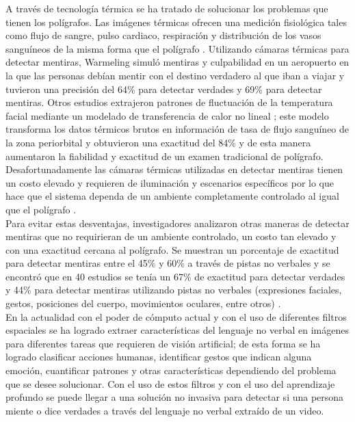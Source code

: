 \begin{onehalfspacing}
A través de tecnología térmica se ha tratado de solucionar los problemas que tienen los polígrafos. Las imágenes térmicas ofrecen una medición fisiológica tales como flujo de sangre, pulso cardiaco, respiración y distribución de los vasos sanguíneos de la misma forma que el polígrafo \cite{Rajoub2014ThermalDetection}. Utilizando cámaras térmicas para detectar mentiras, Warmeling \cite{Warmelink2011ThermalAirports} simuló mentiras y culpabilidad en un aeropuerto en la que las personas debían mentir con el destino verdadero al que iban a viajar y tuvieron una precisión del 64\% para detectar verdades y 69\% para detectar mentiras. Otros estudios extrajeron patrones de fluctuación de la temperatura facial mediante un modelado de transferencia de calor no lineal \cite{Lu2012Conventional-or-high-capacity-thickeners-a-better-choice-to-make.pdf}; este modelo transforma los datos térmicos brutos en información de tasa de flujo sanguíneo de la zona periorbital y obtuvieron una exactitud del 84\% y de esta manera aumentaron la fiabilidad y exactitud de un examen tradicional de polígrafo. Desafortunadamente las cámaras térmicas utilizadas en detectar mentiras tienen un costo elevado y requieren de iluminación y escenarios específicos \cite{Rajoub2014ThermalDetection} por lo que hace que el sistema dependa de un ambiente completamente controlado al igual que el polígrafo .\\

Para evitar estas desventajas, investigadores analizaron otras maneras de detectar mentiras que no requirieran de un ambiente controlado, un costo tan elevado y con una exactitud cercana al polígrafo.
Se muestran un porcentaje de exactitud para detectar mentiras  entre el 45\% y 60\% a través de pistas no verbales y se encontró que en 40 estudios se tenía un 67\% de exactitud para detectar verdades y 44\% para detectar mentiras utilizando pistas no verbales (expresiones faciales, gestos, posiciones del cuerpo, movimientos oculares, entre otros) \cite{Vrij2000DetectingBehavior}.\\

En la actualidad con el poder de cómputo actual y con el uso de diferentes filtros espaciales se ha logrado extraer características del lenguaje no verbal en imágenes para diferentes tareas que requieren de visión artificial; de esta forma se ha logrado clasificar acciones humanas, identificar gestos que indican alguna emoción, cuantificar patrones y otras características dependiendo del problema que se desee solucionar. Con el uso de estos filtros y con el uso del aprendizaje profundo se puede llegar a una solución no invasiva para detectar si una persona miente o dice verdades a través del lenguaje no verbal extraído de un video.\\



\end{onehalfspacing}
